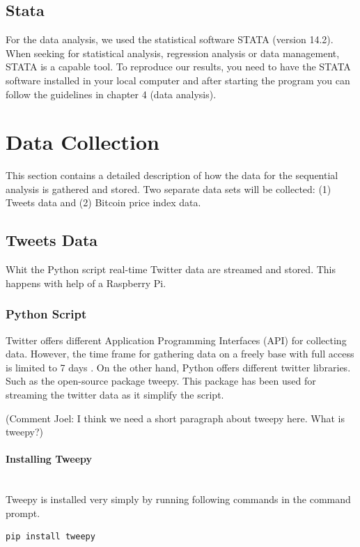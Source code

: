 \documentclass[a4paper,12pt]{article}
\begin{document}
\begin{spacing}{1.2}
\subsection{Stata}
For the data analysis, we used the statistical software STATA (version 14.2). When seeking for statistical analysis, regression analysis or data management, STATA is a capable tool. To reproduce our results, you need to have the STATA software installed in your local computer and after starting the program you can follow the guidelines in chapter 4 (data analysis). 

\clearpage

\section{Data Collection}
This section contains a detailed description of how the data for the sequential analysis is gathered and stored. Two separate data sets will be collected: (1) Tweets data and  (2) Bitcoin price index data.
\subsection{Tweets Data}
Whit the Python script real-time Twitter data are streamed and stored. This happens with help of a Raspberry Pi.
\subsubsection{Python Script}
Twitter offers different Application Programming Interfaces (API) for collecting data. However, the time frame for gathering data on a freely base with full access is limited to 7 days \parencite{twitterinc2017a}. On the other hand, Python offers different twitter libraries. Such as the open-source package tweepy. This package has been used for streaming the twitter data as it simplify the script.

(Comment Joel: I think we need a short paragraph about tweepy here. What is tweepy?)

\paragraph{Installing Tweepy}\mbox{}\\{}
Tweepy is installed very simply by running following commands in the command prompt. 
\begin{lstlisting}[language=bash]
pip install tweepy
\end{lstlisting}


\end{spacing}
\end{document}
